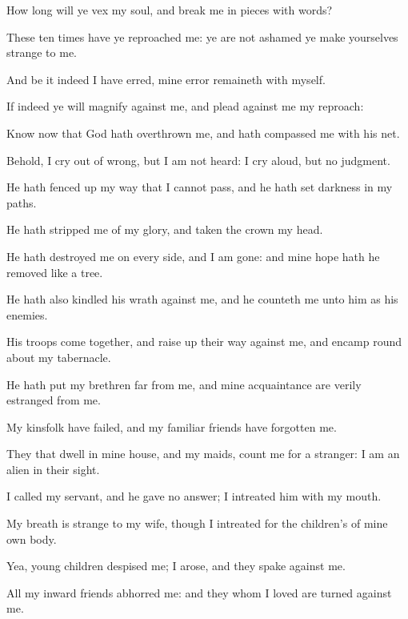 {How long will ye
vex my
soul, and
break me in pieces with
words?

These
ten
times have ye
reproached me: ye are not
ashamed
{} ye make yourselves
strange to me.

And be it
indeed
{} I have
erred, mine
error
remaineth with myself.

If
indeed ye will
magnify
{} against me, and
plead against me my
reproach:

Know
now that
God hath
overthrown me, and hath
compassed me with his
net.

Behold, I cry
out of
wrong, but I am not
heard: I cry
aloud, but
{} no
judgment.


\par }{\PP {}He hath fenced
up my
way that I cannot
pass, and he hath
set
darkness in my
paths.

He hath
stripped me of my
glory, and
taken the
crown
{} my
head.

He hath
destroyed me on every
side, and I am
gone: and mine
hope hath he
removed like a
tree.

He hath also
kindled his
wrath against me, and he
counteth me unto him as
{} his
enemies.

His
troops
come
together, and raise
up their
way against me, and
encamp round
about my
tabernacle.

He hath
put my
brethren
far from me, and mine
acquaintance are verily
estranged from me.

My
kinsfolk have
failed, and my familiar
friends have
forgotten me.

They that
dwell in mine
house, and my
maids,
count me for a
stranger: I am an
alien in their
sight.

I
called my
servant, and he gave
{} no
answer; I
intreated him
with my
mouth.

My
breath is
strange to my
wife, though I
intreated for the
children’s
{} of mine own
body.

Yea, young
children
despised me; I
arose, and they
spake against me.

All my
inward
friends
abhorred me: and they whom I
loved are
turned against me.

}
